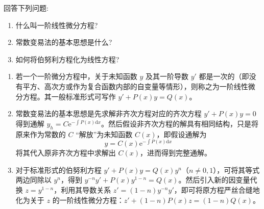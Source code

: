 \documentclass[lang=cn,11pt]{elegantbook}
\begin{document}
\begin{exercise}[基本概念]
回答下列问题:
\begin{enumerate}
    \item[(1)] 什么叫一阶线性微分方程?
    \item[(2)] 常数变易法的基本思想是什么?
    \item[(3)] 如何将伯努利方程化为线性方程?
\end{enumerate}
\end{exercise}
\begin{solution}
\begin{enumerate}
    \item[(1)] 若一个一阶微分方程中，关于未知函数 $y$ 及其一阶导数 $y'$ 都是一次的（即没有平方、高次方或作为复合函数内部的自变量等情形），则称之为一阶线性微分方程。其一般标准形式可写作 $y' + P(x)y = Q(x)$。
    \item[(2)] 常数变易法的基本思想是先求解非齐次方程对应的齐次方程 $y' + P(x)y = 0$ 得到通解 $y_h = C \mathrm{e}^{-\int P(x)\mathrm{d}x}$。然后假设非齐次方程的解具有相同结构，只是将原来作为常数的 $C$ “解放”为未知函数 $C(x)$，即假设通解为 \[y = C(x) \mathrm{e}^{-\int P(x)\mathrm{d}x}\]将其代入原非齐次方程中求解出 $C(x)$，进而得到完整通解。
    \item[(3)] 对于标准形式的伯努利方程 $y' + P(x)y = Q(x)y^n$（$n \neq 0, 1$），可将其等式两边同除以 $y^n$，得到 $y^{-n}y' + P(x)y^{1-n} = Q(x)$。然后引入新的因变量代换 $z = y^{1-n}$，利用其导数关系 $z' = (1-n)y^{-n}y'$，即可将原方程严丝合缝地化为关于 $z$ 的一阶线性微分方程：$z' + (1-n)P(x)z = (1-n)Q(x)$。
\end{enumerate}
\end{solution}
\end{document}
